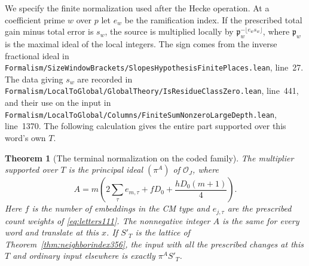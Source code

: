 \documentclass[a4paper,11pt]{article}
\newtheorem{theorem}[proposition]{Theorem}
\theoremstyle{definition}
\theoremstyle{remark}
\newcommand{\srcloc}[2]{{\small\nolinkurl{#1.lean}}, line~#2}
\numberwithin{equation}{section}
\begin{document}
We specify the finite normalization used after the Hecke
operation. At a coefficient prime \(w\) over \(p\) let
\(e_w\) be the ramification index. If the prescribed total gain
minus total error is \(s_w\), the source is multiplied locally
by \(\mathfrak p_w^{-\lfloor e_w s_w\rfloor}\), where
\(\mathfrak p_w\) is the maximal ideal of the local integers.
The sign comes from the inverse fractional ideal in
\srcloc{Formalism/SizeWindowBrackets/SlopesHypothesisFinitePlaces}{27}.
The data giving \(s_w\) are recorded in
\srcloc{Formalism/LocalToGlobal/GlobalTheory/IsResidueClassZero}{441},
and their use on the input in
\srcloc{Formalism/LocalToGlobal/Columns/FiniteSumNonzeroLargeDepth}{1370}.
The following calculation gives the entire part supported over
this word's own \(T\).

\begin{theorem}[The terminal normalization on the coded family]\leavevmode
\label{thm:terminalscalar357}
The multiplier supported over \(T\) is the principal ideal
\((\pi^{A})\) of \(\mathcal O_J\), where
\[
 A=m\left(2\sum_{\tau}e_{m,\tau}+fD_0+
                          \frac{hD_0(m+1)}4\right).
\]
Here \(f\) is the number of embeddings in the CM type and
\(e_{j,\tau}\) are the prescribed count weights of
\eqref{eq:letters111}. The nonnegative integer \(A\) is
the same for every word and translate at this \(x\).
If \(S'_T\) is the lattice of Theorem~\ref{thm:neighborindex356},
the input with all the prescribed changes at this \(T\) and
ordinary input elsewhere is exactly \(\pi^{A}S'_T\).
\end{theorem}
\end{document}
